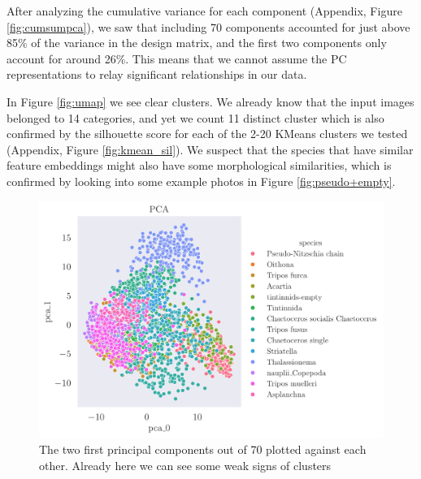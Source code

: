 After analyzing the cumulative variance for each component (Appendix, Figure \ref{fig:cumsumpca}), we saw that including 70 components accounted for just above 85\% of the variance in the design matrix, and the first two components only account for around 26\%. This means that we cannot assume the PC representations to relay significant relationships in our data. 

In Figure \ref{fig:umap} we see clear clusters. We already know that the input images belonged to 14 categories, and yet we count 11 distinct cluster which is also confirmed by the silhouette score for each of the 2-20 KMeans clusters we tested (Appendix, Figure \ref{fig:kmean_sil}). We suspect that the species that have similar feature embeddings might also have some morphological similarities, which is confirmed by looking into some example photos in Figure \ref{fig:pseudo+empty}. 

\begin{figure}[H]
    \centering
    \includegraphics[width=1.1\linewidth]{examples/tests_eb/figs/pca0_pca1.pdf}
    \caption{The two first principal components out of 70 plotted against each other. Already here we can see some weak signs of clusters}
    \label{fig:pca0pca1}
\end{figure}

